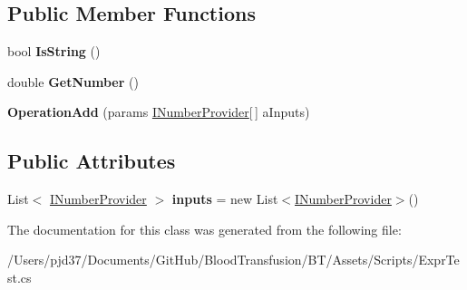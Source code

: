 \subsection*{Public Member Functions}
\begin{DoxyCompactItemize}
\item 
bool {\bfseries Is\+String} ()\hypertarget{class_b83_1_1_logic_expression_parser_1_1_operation_add_a9df1ab04eb0589b17cbf26285914e0ca}{}\label{class_b83_1_1_logic_expression_parser_1_1_operation_add_a9df1ab04eb0589b17cbf26285914e0ca}

\item 
double {\bfseries Get\+Number} ()\hypertarget{class_b83_1_1_logic_expression_parser_1_1_operation_add_a7d6778dcb9853a47756214f41a06c5cc}{}\label{class_b83_1_1_logic_expression_parser_1_1_operation_add_a7d6778dcb9853a47756214f41a06c5cc}

\item 
{\bfseries Operation\+Add} (params \hyperlink{interface_b83_1_1_logic_expression_parser_1_1_i_number_provider}{I\+Number\+Provider}\mbox{[}$\,$\mbox{]} a\+Inputs)\hypertarget{class_b83_1_1_logic_expression_parser_1_1_operation_add_a029d6396f361e2b4bf902a6a13ad820e}{}\label{class_b83_1_1_logic_expression_parser_1_1_operation_add_a029d6396f361e2b4bf902a6a13ad820e}

\end{DoxyCompactItemize}
\subsection*{Public Attributes}
\begin{DoxyCompactItemize}
\item 
List$<$ \hyperlink{interface_b83_1_1_logic_expression_parser_1_1_i_number_provider}{I\+Number\+Provider} $>$ {\bfseries inputs} = new List$<$\hyperlink{interface_b83_1_1_logic_expression_parser_1_1_i_number_provider}{I\+Number\+Provider}$>$()\hypertarget{class_b83_1_1_logic_expression_parser_1_1_operation_add_aa6d4b1c5b29601277559055455f8cf70}{}\label{class_b83_1_1_logic_expression_parser_1_1_operation_add_aa6d4b1c5b29601277559055455f8cf70}

\end{DoxyCompactItemize}


The documentation for this class was generated from the following file\+:\begin{DoxyCompactItemize}
\item 
/\+Users/pjd37/\+Documents/\+Git\+Hub/\+Blood\+Transfusion/\+B\+T/\+Assets/\+Scripts/Expr\+Test.\+cs\end{DoxyCompactItemize}
